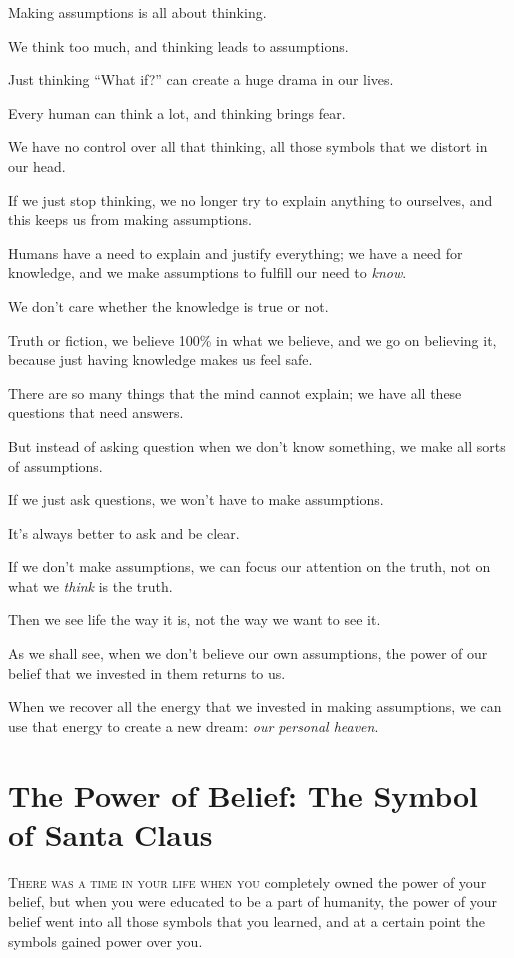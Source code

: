 \documentclass{article}
\numberwithin{equation}{section}
\begin{document}
Making assumptions is all about thinking.

We think too much, and thinking leads to assumptions.

Just thinking ``What if?'' can create a huge drama in our lives.

Every human can think a lot, and thinking brings fear.

We have no control over all that thinking, all those symbols that we distort in our head.

If we just stop thinking, we no longer try to explain anything to ourselves, and this keeps us from making assumptions.

%
Humans have a need to explain and justify everything; we have a need for knowledge, and we make assumptions to fulfill our need to \textit{know}.

We don't care whether the knowledge is true or not.

Truth or fiction, we believe 100\% in what we believe, and we go on believing it, because just having knowledge makes us feel safe.

There are so many things that the mind cannot explain; we have all these questions that need answers.

But instead of asking question when we don't know something, we make all sorts of assumptions.

If we just ask questions, we won't have to make assumptions.

It's always better to ask and be clear.

%
If we don't make assumptions, we can focus our attention on the truth, not on what we \textit{think} is the truth.

Then we see life the way it is, not the way we want to see it.

As we shall see, when we don't believe our own assumptions, the power of our belief that we invested in them returns to us.

When we recover all the energy that we invested in making assumptions, we can use that energy to create a new dream: \textit{our personal heaven}.


\section{The Power of Belief: The Symbol of Santa Claus}
\textsc{There was a time in your life when you} completely owned the power of your belief, but when you were educated to be a part of humanity, the power of your belief went into all those symbols that you learned, and at a certain point the symbols gained power over you.
\end{document}
